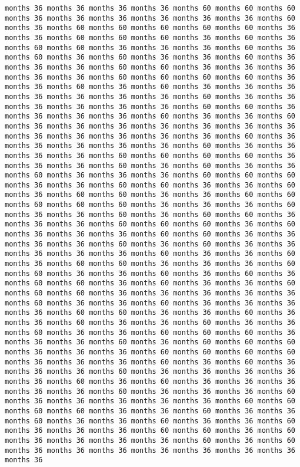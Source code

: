 \documentclass[11pt]{article}
\begin{document}
\begin{Verbatim}[commandchars=\\\{\}, frame=single, framerule=2mm, rulecolor=\color{outerrorbackground}]
months 36 months 36 months 36 months 36 months 60 months 60 months 60 months 36 months 36 months 36 months 36 months 36 months 36 months 60 months 36 months 60 months 60 months 60 months 60 months 60 months 36 months 36 months 60 months 60 months 60 months 36 months 60 months 36 months 60 months 60 months 36 months 36 months 36 months 60 months 36 months 60 months 36 months 60 months 36 months 36 months 60 months 36 months 36 months 36 months 60 months 60 months 36 months 36 months 36 months 36 months 36 months 60 months 60 months 60 months 60 months 36 months 36 months 60 months 36 months 60 months 36 months 36 months 36 months 36 months 36 months 36 months 36 months 60 months 36 months 36 months 36 months 36 months 36 months 36 months 60 months 60 months 36 months 36 months 36 months 36 months 60 months 36 months 36 months 60 months 36 months 36 months 36 months 36 months 36 months 36 months 36 months 36 months 36 months 36 months 36 months 36 months 60 months 36 months 36 months 36 months 36 months 36 months 60 months 36 months 36 months 36 months 36 months 60 months 60 months 60 months 60 months 36 months 36 months 36 months 60 months 36 months 60 months 36 months 36 months 60 months 36 months 36 months 36 months 60 months 60 months 60 months 36 months 36 months 60 months 60 months 36 months 36 months 60 months 36 months 60 months 60 months 36 months 36 months 60 months 60 months 60 months 60 months 60 months 36 months 36 months 36 months 60 months 36 months 36 months 60 months 36 months 60 months 60 months 36 months 36 months 36 months 60 months 60 months 60 months 36 months 60 months 36 months 36 months 36 months 60 months 60 months 36 months 36 months 36 months 36 months 60 months 36 months 60 months 36 months 36 months 36 months 36 months 36 months 60 months 36 months 36 months 60 months 36 months 60 months 60 months 36 months 36 months 36 months 60 months 60 months 36 months 36 months 60 months 36 months 60 months 36 months 60 months 60 months 36 months 60 months 36 months 36 months 60 months 60 months 60 months 36 months 36 months 36 months 36 months 36 months 60 months 36 months 36 months 60 months 36 months 36 months 36 months 36 months 60 months 60 months 36 months 36 months 60 months 36 months 36 months 60 months 36 months 36 months 60 months 36 months 36 months 60 months 36 months 36 months 60 months 60 months 60 months 36 months 36 months 36 months 60 months 36 months 60 months 60 months 60 months 36 months 36 months 36 months 60 months 60 months 60 months 60 months 36 months 36 months 36 months 60 months 36 months 60 months 36 months 36 months 36 months 60 months 36 months 36 months 36 months 36 months 36 months 60 months 36 months 60 months 36 months 36 months 36 months 36 months 36 months 60 months 36 months 36 months 36 months 60 months 36 months 36 months 36 months 36 months 36 months 60 months 60 months 60 months 60 months 36 months 36 months 60 months 36 months 36 months 60 months 36 months 36 months 60 months 36 months 36 months 60 months 36 months 36 months 36 months 60 months 60 months 36 months 60 months 36 months 36 months 36 months 36 months 60 months 36 months 60 months 36 months 36 months 36 months 36 months 36 months 36 months 36 months 36 
\end{Verbatim}
\end{document}
